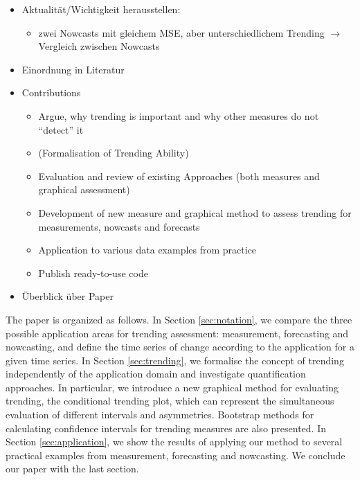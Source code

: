 
\begin{itemize}
    \item Aktualität/Wichtigkeit herausstellen: 
    \begin{itemize}
        \item zwei Nowcasts mit gleichem MSE, aber unterschiedlichem Trending $\rightarrow$ Vergleich zwischen Nowcasts
    \end{itemize}
    \item Einordnung in Literatur
    \item Contributions
    \begin{itemize}
        \item Argue, why trending is important and why other measures do not \enquote{detect} it
        \item (Formalisation of Trending Ability)
        \item Evaluation and review of existing Approaches (both measures and graphical assessment)
        \item Development of new measure and graphical method to assess trending for measurements, nowcasts and forecasts
        \item Application to various data examples from practice
        \item Publish ready-to-use code
    \end{itemize}
    \item Überblick über Paper
\end{itemize}

The paper is organized as follows. In Section \ref{sec:notation}, we compare the three possible application areas for trending assessment: measurement, forecasting and nowcasting, and define the time series of change according to the application for a given time series. In Section \ref{sec:trending}, we formalise the concept of trending independently of the application domain and investigate quantification approaches. In particular, we introduce a new graphical method for evaluating trending, the conditional trending plot, which can represent the simultaneous evaluation of different intervals and asymmetries. Bootstrap methods for calculating confidence intervals for trending measures are also presented. In Section \ref{sec:application}, we show the results of applying our method to several practical examples from measurement, forecasting and nowcasting. We conclude our paper with the last section.